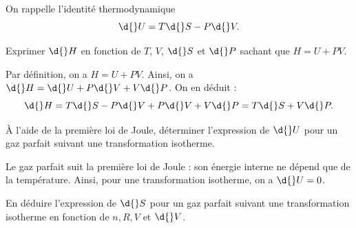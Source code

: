 \debutEntrainement

	On rappelle l'identité thermodynamique 
	\[
	\d{}U=T\d{}S-P\d{}V.
	\]

\smallskip


\begin{enonce}
Exprimer $\d{}H$ en fonction de $T$, $V$, $\d{}S$ et $\d{}P$ sachant que $H=U+PV$. \minusSmallskip

\end{enonce}


\begin{corrige}
Par définition, on a $H=U+PV$. Ainsi, on a $\d{}H=\d{}U+P\d{}V+V\d{}P$. On en déduit : 
\[
\d{}H=T\d{}S-P\d{}V+P\d{}V+V\d{}P=T\d{}S+V\d{}P.
\]
\end{corrige}





\begin{enonce}
À l'aide de la première loi de Joule, déterminer l'expression de $\d{}U$ pour un gaz parfait suivant une transformation isotherme.

\end{enonce}


\begin{corrige}
Le gaz parfait suit la première loi de Joule : son énergie interne ne dépend que de la température. Ainsi, pour une transformation isotherme, on a $\d{}U=0$.
\end{corrige}




\begin{enonce}
En déduire l'expression de $\d{}S$ pour un gaz parfait suivant une transformation isotherme en fonction de $n, R, V$ et $\d{}V$. \minusMedskip

\end{enonce}

